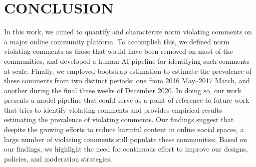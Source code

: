 \section{CONCLUSION}
In this work, we aimed to quantify and characterize norm violating comments on a major online community platform. To accomplish this, we defined norm violating comments as those that would have been removed on most of the communities, and developed a human-AI pipeline for identifying such comments at scale. Finally, we employed bootstrap estimation to estimate the prevalence of these comments from two distinct periods: one from 2016 May--2017 March, and another during the final three weeks of December 2020. In doing so, our work presents a model pipeline that could serve as a point of reference to future work that tries to identify violating comments and provides empirical results estimating the prevalence of violating comments. Our findings suggest that despite the growing efforts to reduce harmful content in online social spaces, a large number of violating comments still populate these communities. Based on our findings, we highlight the need for continuous effort to improve our designs, policies, and moderation strategies.
